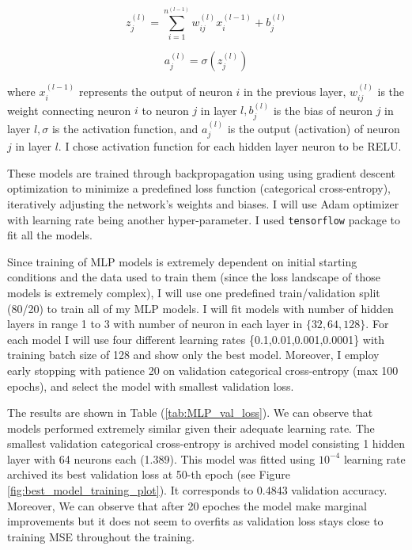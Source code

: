 \documentclass{assignment}
\begin{document}
$$
z_j^{(l)} = \sum_{i=1}^{n^{(l-1)}} w_{ij}^{(l)} x_i^{(l-1)} + b_j^{(l)}
$$

$$
a_j^{(l)} = \sigma(z_j^{(l)})
$$

where $x_i^{(l-1)}$ represents the output of neuron $i$ in the previous layer, $w_{i j}^{(l)}$ is the weight connecting neuron $i$ to neuron $j$ in layer $l, b_j^{(l)}$ is the bias of neuron $j$ in layer $l, \sigma$ is the activation function, and $a_j^{(l)}$ is the output (activation) of neuron $j$ in layer $l$. I chose activation function for each hidden layer neuron to be RELU.


\smallskip

These models are trained through backpropagation using using gradient descent optimization to minimize a predefined loss function (categorical cross-entropy), iteratively adjusting the network's weights and biases. I will use Adam optimizer with learning rate being another hyper-parameter. I used \texttt{tensorflow} package to fit all the models.

\smallskip

Since training of MLP models is extremely dependent on initial starting conditions and the data used to train them (since the loss landscape of those models is extremely complex), I will use one predefined train/validation split (80/20) to train all of my MLP models. I will fit models with number of hidden layers in range 1 to 3 with number of neuron in each layer in $\{32,64,128\}$. For each model I will use four different learning rates \{0.1,0.01,0.001,0.0001\} with training batch size of 128 and show only the best model. Moreover, I employ early stopping with patience 20 on validation categorical cross-entropy (max 100 epochs), and select the model with smallest validation loss. 

\smallskip


The results are shown in Table (\ref{tab:MLP_val_loss}). We can observe that models performed extremely similar given their adequate learning rate. The smallest validation categorical cross-entropy is archived model consisting 1 hidden layer with 64 neurons each (1.389). This model was fitted using $10^{-4}$ learning rate archived its best validation loss at 50-th epoch (see Figure \ref{fig:best_model_training_plot}). It corresponds to 0.4843 validation accuracy. Moreover, We can observe that after 20 epoches the model make marginal improvements but it does not seem to overfits as validation loss stays close to training MSE throughout the training.
\end{document}
